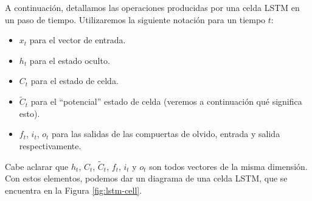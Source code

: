 \documentclass[../../main.tex]{subfiles}
\begin{document}
A continuación, detallamos las operaciones producidas por una celda LSTM en un paso de
tiempo. Utilizaremos la siguiente notación para un tiempo \(t\):
\begin{itemize}[itemsep=0.1cm]
    \item \(x_t\) para el vector de entrada.
    \item \(h_t\) para el estado oculto.
    \item \(C_t\) para el estado de celda.
    \item \(\tilde{C}_t\) para el ``potencial'' estado de celda (veremos a continuación
    qué significa esto).
    \item \(f_t\), \(i_t\), \(o_t\) para las salidas de las compuertas de olvido,
    entrada y salida respectivamente.
\end{itemize}
Cabe aclarar que \(h_t\), \(C_t\), \(\tilde{C}_t\), \(f_t\), \(i_t\) y \(o_t\) son todos
vectores de la misma dimensión. Con estos elementos, podemos dar un diagrama de una celda
LSTM, que se encuentra en la Figura \ref{fig:lstm-cell}.
\end{document}
